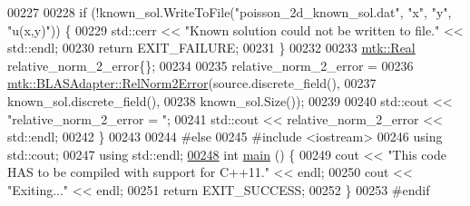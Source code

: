 \begin{DoxyCode}
00227 
00228   \textcolor{keywordflow}{if} (!known\_sol.WriteToFile(\textcolor{stringliteral}{"poisson\_2d\_known\_sol.dat"}, \textcolor{stringliteral}{"x"}, \textcolor{stringliteral}{"y"}, \textcolor{stringliteral}{"u(x,y)"})) \{
00229     std::cerr << \textcolor{stringliteral}{"Known solution could not be written to file."} << std::endl;
00230     \textcolor{keywordflow}{return} EXIT\_FAILURE;
00231   \}
00232 
00233   \hyperlink{group__c01-roots_gac080bbbf5cbb5502c9f00405f894857d}{mtk::Real} relative\_norm\_2\_error\{\};
00234 
00235   relative\_norm\_2\_error =
00236     \hyperlink{classmtk_1_1BLASAdapter_af2ac5691f45e67d6e26186b071119ec4}{mtk::BLASAdapter::RelNorm2Error}(source.discrete\_field(),
00237                                     known\_sol.discrete\_field(),
00238                                     known\_sol.Size());
00239 
00240   std::cout << \textcolor{stringliteral}{"relative\_norm\_2\_error = "};
00241   std::cout << relative\_norm\_2\_error << std::endl;
00242 \}
00243 
00244 \textcolor{preprocessor}{#else}
00245 \textcolor{preprocessor}{#include <iostream>}
00246 \textcolor{keyword}{using} std::cout;
00247 \textcolor{keyword}{using} std::endl;
\hypertarget{poisson__2d_8cc_source_l00248}{}\hyperlink{poisson__2d_8cc_ae66f6b31b5ad750f1fe042a706a4e3d4}{00248} \textcolor{keywordtype}{int} \hyperlink{poisson__2d_8cc_ae66f6b31b5ad750f1fe042a706a4e3d4}{main} () \{
00249   cout << \textcolor{stringliteral}{"This code HAS to be compiled with support for C++11."} << endl;
00250   cout << \textcolor{stringliteral}{"Exiting..."} << endl;
00251   \textcolor{keywordflow}{return} EXIT\_SUCCESS;
00252 \}
00253 \textcolor{preprocessor}{#endif}
\end{DoxyCode}
